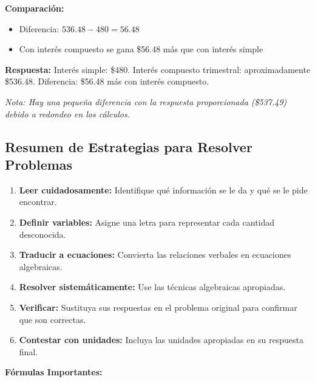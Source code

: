 \textbf{Comparación:}
\begin{itemize}
    \item Diferencia: $536.48 - 480 = 56.48$
    \item Con interés compuesto se gana \$56.48 más que con interés simple
\end{itemize}

\textbf{Respuesta:} Interés simple: \$480. Interés compuesto trimestral: aproximadamente \$536.48. Diferencia: \$56.48 más con interés compuesto.

\textit{Nota: Hay una pequeña diferencia con la respuesta proporcionada (\$537.49) debido a redondeo en los cálculos.}

\hrulefill


\subsection*{Resumen de Estrategias para Resolver Problemas}

\begin{enumerate}
    \item \textbf{Leer cuidadosamente:} Identifique qué información se le da y qué se le pide encontrar.

    \item \textbf{Definir variables:} Asigne una letra para representar cada cantidad desconocida.

    \item \textbf{Traducir a ecuaciones:} Convierta las relaciones verbales en ecuaciones algebraicas.

    \item \textbf{Resolver sistemáticamente:} Use las técnicas algebraicas apropiadas.

    \item \textbf{Verificar:} Sustituya sus respuestas en el problema original para confirmar que son correctas.

    \item \textbf{Contestar con unidades:} Incluya las unidades apropiadas en su respuesta final.
\end{enumerate}

\vspace{1cm}

\textbf{Fórmulas Importantes:}

